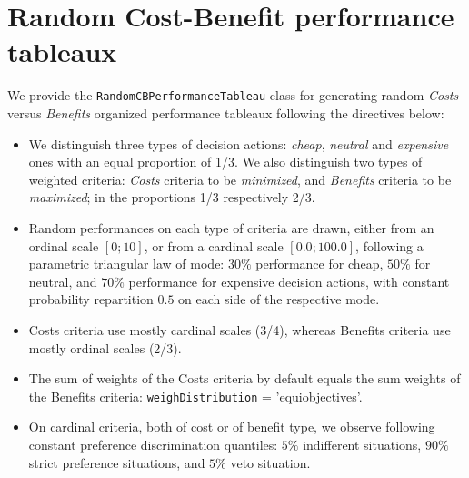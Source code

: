 \section{Random Cost-Benefit performance tableaux}
\label{sec:6.3}

We provide the \texttt{RandomCBPerformanceTableau} class for generating random \emph{Costs} versus \emph{Benefits} organized performance tableaux following the directives below:
\begin{itemize}[leftmargin=0.5cm,rightmargin=0.5cm]
\item We distinguish three types of decision actions: \emph{cheap}, \emph{neutral} and \emph{expensive} ones with an equal proportion of 1/3. We also distinguish two types of weighted criteria: \emph{Costs} criteria to be \emph{minimized}, and \emph{Benefits} criteria to be \emph{maximized}; in the proportions 1/3 respectively 2/3. 
\item  Random performances on each type of criteria  are drawn, either from an ordinal scale $[0;10]$, or from a cardinal scale $[0.0;100.0]$, following a parametric triangular law of mode: $30\%$ performance for cheap, $50\%$ for neutral, and $70\%$ performance for expensive decision actions, with constant probability repartition $0.5$ on each side of the respective mode. 
\item Costs criteria use mostly cardinal scales (3/4), whereas Benefits criteria use mostly ordinal scales (2/3). 
\item  The sum of weights of the Costs criteria by default equals the sum weights of the Benefits criteria: \texttt{weighDistribution} = 'equiobjectives'. 
\item On cardinal criteria, both of cost or of benefit type, we observe following constant preference discrimination quantiles: $5\%$ indifferent situations, $90\%$ strict preference situations, and $5\%$ veto situation. 
\end{itemize}

